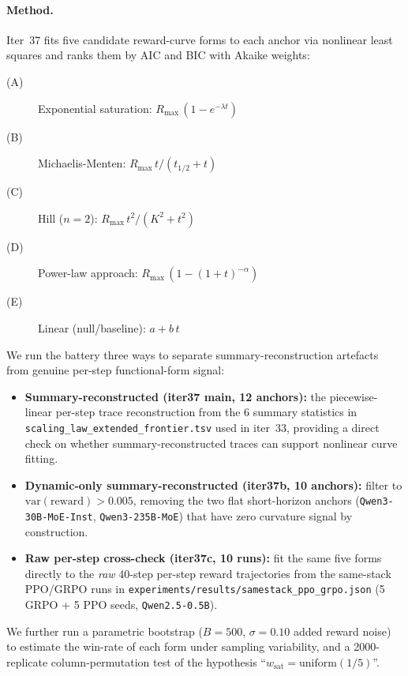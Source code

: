 \paragraph{Method.}
Iter~37 fits five candidate reward-curve forms to each anchor via
nonlinear least squares and ranks them by AIC and BIC with Akaike
weights:
\begin{description}
\item[(A)] Exponential saturation: $R_{\max}\,(1 - e^{-\lambda t})$
\item[(B)] Michaelis-Menten: $R_{\max}\,t/(t_{1/2} + t)$
\item[(C)] Hill ($n=2$): $R_{\max}\,t^2/(K^2 + t^2)$
\item[(D)] Power-law approach: $R_{\max}\,(1 - (1 + t)^{-\alpha})$
\item[(E)] Linear (null/baseline): $a + b\,t$
\end{description}
We run the battery three ways to separate summary-reconstruction
artefacts from genuine per-step functional-form signal:
\begin{itemize}
\item \textbf{Summary-reconstructed (iter37 main, 12 anchors):} the
  piecewise-linear per-step trace reconstruction from the 6 summary
  statistics in \texttt{scaling\_law\_extended\_frontier.tsv} used in
  iter~33, providing a direct check on whether summary-reconstructed
  traces can support nonlinear curve fitting.
\item \textbf{Dynamic-only summary-reconstructed (iter37b, 10 anchors):}
  filter to $\mathrm{var}(\mathrm{reward}) > 0.005$, removing the two
  flat short-horizon anchors (\texttt{Qwen3-30B-MoE-Inst},
  \texttt{Qwen3-235B-MoE}) that have zero curvature signal by
  construction.
\item \textbf{Raw per-step cross-check (iter37c, 10 runs):} fit the
  same five forms directly to the \emph{raw} 40-step per-step reward
  trajectories from the same-stack PPO/GRPO runs in
  \texttt{experiments/results/samestack\_ppo\_grpo.json}
  (5 GRPO + 5 PPO seeds, \texttt{Qwen2.5-0.5B}).
\end{itemize}
We further run a parametric bootstrap ($B=500$, $\sigma=0.10$ added
reward noise) to estimate the win-rate of each form under sampling
variability, and a 2000-replicate column-permutation test of the
hypothesis ``$w_{\mathrm{sat}} = \text{uniform}(1/5)$''.

